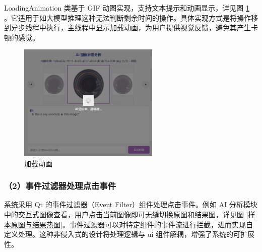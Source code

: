 \documentclass[
  ]{njuthesis}
\begin{document}
LoadingAnimation 类基于 GIF 动图实现，支持文本提示和动画显示，详见图 \ref{加载动画} 。它适用于如大模型推理这种无法判断剩余时间的操作。具体实现方式是将操作移到异步线程中执行，主线程中显示加载动画，为用户提供视觉反馈，避免其产生卡顿的感觉。

\begin{figure}[H]
    \centering
    \includegraphics[width=0.6\textwidth]{images/加载动画.png}
    \caption{加载动画}
    \label{加载动画}
\end{figure}

\subsubsection{（2）事件过滤器处理点击事件}

系统采用 Qt 的事件过滤器（Event Filter）组件处理点击事件。例如 AI 分析模块中的交互式图像查看，用户点击当前图像即可无缝切换原图和结果图，详见图 \ref{样本原图与结果热图}。事件过滤器可以对特定组件的事件流进行拦截，进而实现自定义处理。这种非侵入式的设计将处理逻辑与 ui 组件解耦，增强了系统的可扩展性。
\end{document}
